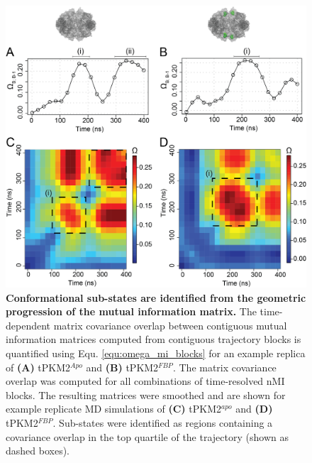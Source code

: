 \begin{figure}[!ht]
\includegraphics[scale=0.7]{ch6_fig10_omega_traj.png}
\caption[Conformational sub-states are identified from the geometric progression of the mutual information matrix.]{\textbf{Conformational sub-states are identified from the geometric progression of the mutual information matrix.} The time-dependent matrix covariance overlap between contiguous mutual information matrices computed from contiguous trajectory blocks is quantified using Equ. \ref{equ:omega_mi_blocks} for an example replica of \textbf{(A)} tPKM2$^{Apo}$ and \textbf{(B)} tPKM2$^{FBP}$. The matrix covariance overlap was computed for all combinations of time-resolved nMI blocks. The resulting matrices were smoothed and are shown for example replicate MD simulations of \textbf{(C)} tPKM2$^{apo}$ and \textbf{(D)} tPKM2$^{FBP}$. Sub-states were identified as regions containing a covariance overlap in the top quartile of the trajectory (shown as dashed boxes).}
\label{fig:cov_overlap_trj}
\end{figure}
%
%
\clearpage

